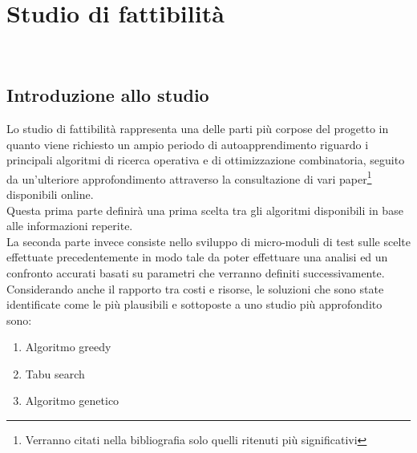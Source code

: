 
\chapter{Studio di fattibilità}
\label{cap:studio-fattibilita}

\noindent {}\\

\section{Introduzione allo studio}
\noindent Lo studio di fattibilità rappresenta una delle parti più corpose
del progetto in quanto viene richiesto un ampio periodo di autoapprendimento
riguardo i principali algoritmi di ricerca operativa e di ottimizzazione combinatoria,
seguito da un'ulteriore approfondimento attraverso la consultazione di vari paper\footnote[2]{Verranno citati nella bibliografia solo quelli ritenuti più significativi}
disponibili online.\\

\noindent Questa prima parte definirà una prima scelta tra gli algoritmi disponibili in base alle informazioni reperite.\\

\noindent La seconda parte invece consiste nello sviluppo di micro-moduli di test sulle scelte effettuate
precedentemente in modo tale da poter effettuare una analisi ed un confronto accurati basati su parametri che verranno
definiti successivamente.\\

\noindent Considerando anche il rapporto tra costi e risorse, le soluzioni che sono state identificate come le più plausibili e sottoposte a uno studio più approfondito sono:
\begin{enumerate}
    \item Algoritmo greedy
    \item Tabu search
    \item Algoritmo genetico
\end{enumerate}

